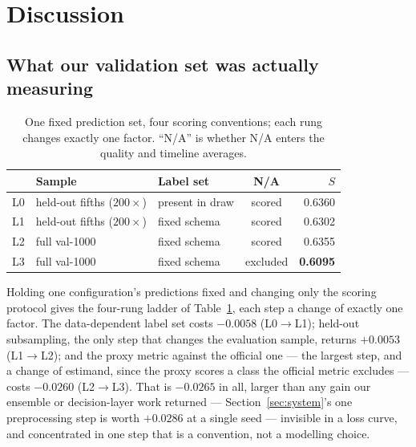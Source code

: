 \section{Discussion}
\label{sec:discussion}

\subsection{What our validation set was actually measuring}

\begin{table}[t]
\centering\footnotesize
\caption{One fixed prediction set, four scoring conventions; each rung changes exactly one
factor. ``N/A'' is whether N/A enters the quality and timeline averages.}
\label{tab:ladder}
\begin{tabular}{@{}lllcr@{}}
\toprule
 & Sample & Label set & N/A & $S$ \\
\midrule
L0 & held-out fifths ($200\times$) & present in draw & scored & 0.6360 \\
L1 & held-out fifths ($200\times$) & fixed schema & scored & 0.6302 \\
L2 & full val-1000 & fixed schema & scored & 0.6355 \\
L3 & full val-1000 & fixed schema & excluded & \textbf{0.6095} \\
\bottomrule
\end{tabular}
\end{table}

Holding one configuration's predictions fixed and changing only the scoring protocol gives the
four-rung ladder of Table~\ref{tab:ladder}, each step a change of exactly one factor. The
data-dependent label set costs $-0.0058$ (L0$\to$L1); held-out subsampling, the only step that
changes the evaluation sample, returns $+0.0053$ (L1$\to$L2); and the proxy metric against the
official one --- the largest step, and a change of estimand, since the proxy scores a class the
official metric excludes --- costs $-0.0260$ (L2$\to$L3). That is $-0.0265$ in all, larger than
any gain our ensemble or decision-layer work returned --- Section~\ref{sec:system}'s one
preprocessing step is worth $+0.0286$ at a single seed --- invisible in a loss curve, and
concentrated in one step that is a convention, not a modelling choice.

